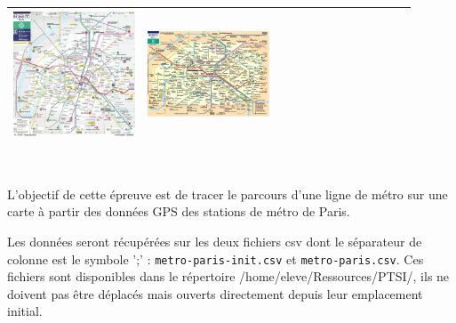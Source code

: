 \begin{tabular}{|m{0.3\linewidth}|m{0.3\linewidth}|m{0.3\linewidth}|}
\includegraphics[width=\linewidth]{img/2000}&
\includegraphics[width=\linewidth]{img/2015}\\
\hline
\end{tabular}

~\

L'objectif de cette épreuve est de tracer le parcours d'une ligne de métro sur une carte à partir des données GPS des stations de métro de Paris.

Les données seront récupérées sur les deux fichiers csv dont le séparateur de colonne est le symbole ';' : \verb?metro-paris-init.csv? et \verb?metro-paris.csv?. Ces fichiers sont disponibles dans le répertoire \og/home/eleve/Ressources/PTSI/\fg, ils ne doivent pas être déplacés mais ouverts directement depuis leur emplacement initial.

